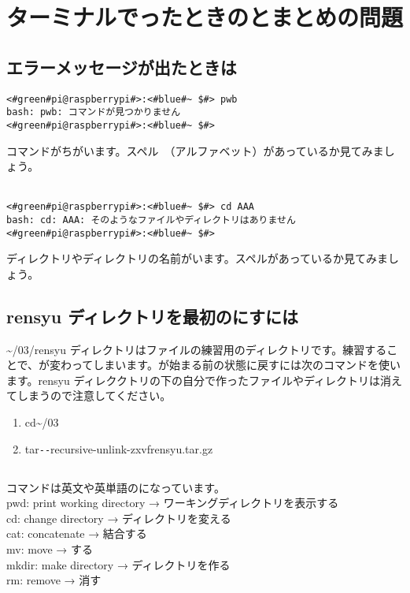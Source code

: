 \newpage
\section{ターミナルでったときのとまとめの問題}

\subsection{エラーメッセージが出たときは}
\begin{lstlisting}[caption=コマンドがちがうときの例, label=cmdMiss]
<#green#pi@raspberrypi#>:<#blue#~ $#> pwb
bash: pwb: コマンドが見つかりません
<#green#pi@raspberrypi#>:<#blue#~ $#> 
\end{lstlisting}
コマンドがちがいます。スペル　（アルファベット）があっているか見てみましょう。\\\\

\begin{lstlisting}[caption=ディレクトリやファイルの名前がちがうときの例, label=nameMiss]
<#green#pi@raspberrypi#>:<#blue#~ $#> cd AAA
bash: cd: AAA: そのようなファイルやディレクトリはありません
<#green#pi@raspberrypi#>:<#blue#~ $#> 
\end{lstlisting}
ディレクトリやディレクトリの名前がいます。スペルがあっているか見てみましょう。\\


\subsection{rensyu ディレクトリを最初のにすには}
\textasciitilde /03/rensyu ディレクトリはファイルの練習用のディレクトリです。練習することで、が変わってしまいます。が始まる前の状態に戻すには次のコマンドを使います。rensyu ディレククトリの下の自分で作ったファイルやディレクトリは消えてしまうので注意してください。\\
\begin{enumerate}
\item  cd\textvisiblespace \textasciitilde /03
\item  tar\textvisiblespace \verb|--|recursive-unlink\textvisiblespace -zxvf\textvisiblespace rensyu.tar.gz
\end{enumerate}

\subsection{}
\label{英語と日本語の対応表}
コマンドは英文や英単語のになっています。\\
pwd: print working directory → ワーキングディレクトリを表示する\\
cd: change directory → ディレクトリを変える\\
cat: concatenate → 結合する\\
mv: move → する\\
mkdir: make directory → ディレクトリを作る\\
rm: remove → 消す\\
